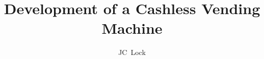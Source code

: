 \documentclass[report,                       %
               12pt,oneside,openany,a4paper, %
               report, a5block,          	%
               afrikaans, english,            %
               ]{usthesis}
\title{Development of a Cashless Vending Machine}
\author{JC\ Lock}
       {JC Lock \\16016548}
\begin{document}
\frontmatter%

%
%
%
%
%

\mainmatter%










\appendix%

%
%
%

\backmatter%
\raggedright
\footnotesize
%
\end{document}
